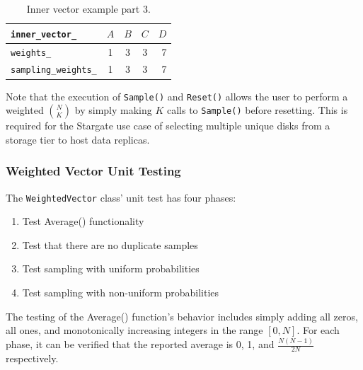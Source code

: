 \documentclass[12pt]{article}
\begin{document}
    \begin{table}[htbp]
      \caption{Inner vector example part 3.}
      \label{tbl:inner-vec-4}
      \begin{center}
      \begin{tabular}{ | l | c | c | c | r | }
        \hline
        \verb|inner_vector_| & $A$ & $B$ & $C$ & $D$ \\ \hline
        \verb|weights_| & 1 & 3 & 3 & 7 \\ \hline
        \verb|sampling_weights_| & 1 & 3 & 3 & 7 \\ \hline
        \hline
      \end{tabular}
      \end{center}
    \end{table}

    Note that the execution of \texttt{Sample()} and \texttt{Reset()} allows the
    user to perform a weighted $\binom{N}{K}$ by simply making $K$ calls to
    \texttt{Sample()} before resetting. This is required for the Stargate use
    case of selecting multiple unique disks from a storage tier to host data
    replicas.

    \FloatBarrier

    \newpage

    \subsubsection{Weighted Vector Unit Testing}

    The \texttt{WeightedVector} class' unit test has four phases:

    \begin{tcolorbox}
    \begin{enumerate}
      \item Test Average() functionality
      \item Test that there are no duplicate samples
      \item Test sampling with uniform probabilities
      \item Test sampling with non-uniform probabilities
    \end{enumerate}
    \end{tcolorbox}

    The testing of the Average() function's behavior includes simply adding all
    zeros, all ones, and monotonically increasing integers in the range
    $[0,N]$. For each phase, it can be verified that the reported average is 0,
    1, and $\frac{N(N-1)}{2N}$ respectively.  
\end{document}
